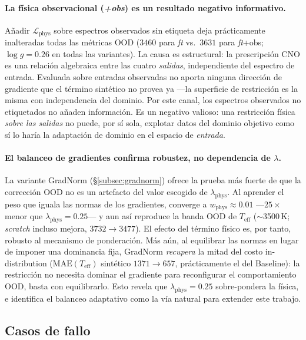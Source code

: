 \documentclass[sigconf,ACM]{acmart}
\begin{document}
\paragraph{La física observacional (\emph{+obs}) es un resultado negativo
informativo.} Añadir $\mathcal{L}_\mathrm{phys}$ sobre espectros observados sin
etiqueta deja prácticamente inalteradas todas las métricas OOD ($3460$ para
\emph{ft} vs.\ $3631$ para \emph{ft}+obs; $\log g\!=\!0.26$ en todas las
variantes). La causa es estructural: la prescripción CNO es una relación
algebraica entre las cuatro \emph{salidas}, independiente del espectro de entrada.
Evaluada sobre entradas observadas no aporta ninguna dirección de gradiente que el
término sintético no provea ya ---la superficie de restricción es la misma con
independencia del dominio. Por este canal, los espectros observados no etiquetados
no añaden información. Es un negativo valioso: una restricción física \emph{sobre
las salidas} no puede, por sí sola, explotar datos del dominio objetivo como sí lo
haría la adaptación de dominio en el espacio de \emph{entrada}.

\paragraph{El balanceo de gradientes confirma robustez, no dependencia de
$\lambda$.} La variante GradNorm (§\ref{subsec:gradnorm}) ofrece la prueba más
fuerte de que la corrección OOD no es un artefacto del valor escogido de
$\lambda_\mathrm{phys}$. Al aprender el peso que iguala las normas de los
gradientes, converge a $w_\mathrm{phys}\!\approx\!0.01$ ---$25\times$ menor que
$\lambda_\mathrm{phys}=0.25$--- y aun así reproduce la banda OOD de $T_\mathrm{eff}$
($\sim$3500\,K; \emph{scratch} incluso mejora, $3732\to3477$). El efecto del
término físico es, por tanto, robusto al mecanismo de ponderación. Más aún, al
equilibrar las normas en lugar de imponer una dominancia fija, GradNorm \emph{recupera}
la mitad del costo in-distribution ($\mathrm{MAE}(T_\mathrm{eff})$ sintético
$1371\to657$, prácticamente el del Baseline): la restricción no necesita dominar el
gradiente para reconfigurar el comportamiento OOD, basta con equilibrarlo. Esto
revela que $\lambda_\mathrm{phys}=0.25$ sobre-pondera la física, e identifica el
balanceo adaptativo como la vía natural para extender este trabajo.

\subsection{Casos de fallo}
\end{document}
